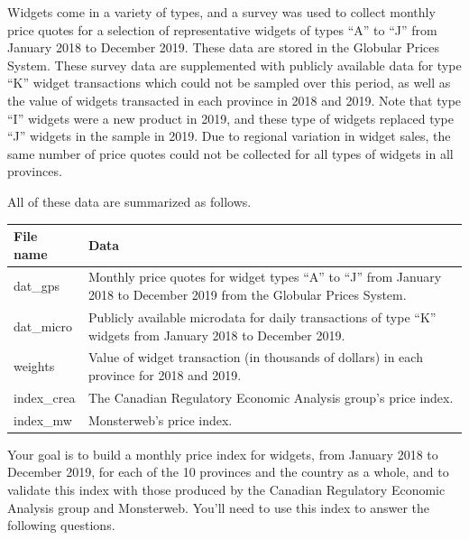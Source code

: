 \documentclass[
]{article}
\begin{document}
Widgets come in a variety of types, and a survey was used to collect monthly price quotes for a selection of representative widgets of types ``A'' to ``J'' from January 2018 to December 2019. These data are stored in the Globular Prices System. These survey data are supplemented with publicly available data for type ``K'' widget transactions which could not be sampled over this period, as well as the value of widgets transacted in each province in 2018 and 2019. Note that type ``I'' widgets were a new product in 2019, and these type of widgets replaced type ``J'' widgets in the sample in 2019. Due to regional variation in widget sales, the same number of price quotes could not be collected for all types of widgets in all provinces.

All of these data are summarized as follows.

\begin{longtable}[]{@{}
  >{\raggedright\arraybackslash}p{}
  >{\raggedright\arraybackslash}p{}@{}}
\toprule
File name & Data \\
\midrule
\endhead
dat\_gps & Monthly price quotes for widget types ``A'' to ``J'' from January 2018 to December 2019 from the Globular Prices System. \\
dat\_micro & Publicly available microdata for daily transactions of type ``K'' widgets from January 2018 to December 2019. \\
weights & Value of widget transaction (in thousands of dollars) in each province for 2018 and 2019. \\
index\_crea & The Canadian Regulatory Economic Analysis group's price index. \\
index\_mw & Monsterweb's price index. \\
\bottomrule
\end{longtable}

Your goal is to build a monthly price index for widgets, from January 2018 to December 2019, for each of the 10 provinces and the country as a whole, and to validate this index with those produced by the Canadian Regulatory Economic Analysis group and Monsterweb. You'll need to use this index to answer the following questions.
\end{document}
